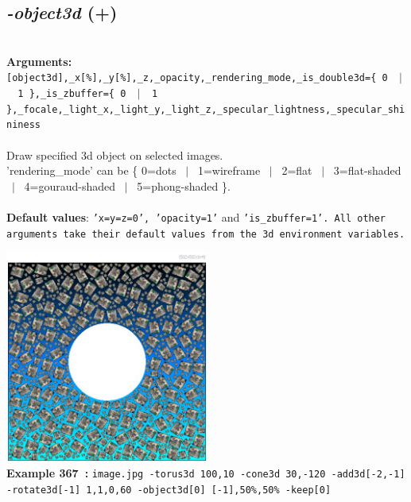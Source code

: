 \documentclass[a4paper,11pt,twoside]{book}
\begin{document}
\subsection{\emph{-object3d} (+)}\vspace*{-0.5em}
~\\\textbf{Arguments: } 
{\small \texttt{[object3d],\_x[\%],\_y[\%],\_z,\_opacity,\_rendering\_mode,\_is\_double3d=\{ 0 ~$|$~ 1 \},\_is\_zbuffer=\{ 0 ~$|$~ 1 \},\_focale,\_light\_x,\_light\_y,\_light\_z,\_specular\_lightness,\_specular\_shininess}}\\~\\
Draw specified 3d object on selected images.
~\\'rendering\_mode' can be \{ 0=dots ~$|$~ 1=wireframe ~$|$~ 2=flat ~$|$~ 3=flat-shaded ~$|$~ 4=gouraud-shaded ~$|$~ 5=phong-shaded \}.
~\\~\\\textbf{Default values}: {\small \texttt{'x=y=z=0', 'opacity=1'} and \texttt{'is\_zbuffer=1'. All other arguments take their default values from the 3d environment variables.}}
\begin{center}\includegraphics[keepaspectratio=true,height=7cm,width=\textwidth]{img/gmic_def367.jpg}\\
{\footnotesize \textbf{Example 367~:} \texttt{image.jpg -torus3d 100,10 -cone3d 30,-120 -add3d[-2,-1] -rotate3d[-1] 1,1,0,60 -object3d[0] [-1],50\%,50\% -keep[0]}}
\end{center}
\end{document}
